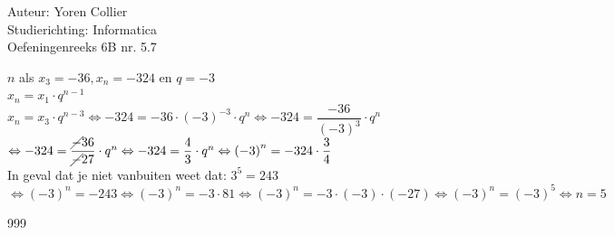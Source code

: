 \documentclass[a4paper]{article}
\newcommand{\asa}{\Leftrightarrow} %
\newcommand{\Lh}{\left(} %
\newcommand{\Rh}{\right)}
\newcommand{\schrap}{\cancel}
\begin{document}
\noindent \large Auteur: Yoren Collier \\
\noindent \large Studierichting: Informatica\\
\noindent \large Oefeningenreeks 6B nr. 5.7\\

\medskip

\normalsize

$n$ als $x_3 = -36, x_n = -324$ en $q = -3$\\

$x_n = x_1 \cdot q^{n-1}$\\

$x_n = x_3 \cdot q^{n-3} \asa -324 = -36 \cdot \Lh -3 \Rh^{-3} \cdot q^n \asa -324 = \dfrac{-36}{\Lh -3 \Rh^3} \cdot q^n$\\

$\asa -324 = \dfrac{\schrap{-}36}{\schrap{-}27} \cdot q^n \asa -324 = \dfrac{4}{3} \cdot q^n \asa \Lh -3 \Rh^n = -324 \cdot \dfrac{3}{4}$\\

In geval dat je niet vanbuiten weet dat: $3^5 = 243$\\

$\asa \Lh -3 \Rh^n = -243 \asa \Lh -3 \Rh^n = -3 \cdot 81 \asa \Lh -3 \Rh^n = -3 \cdot \Lh -3 \Rh \cdot \Lh -27 \Rh \asa \Lh -3 \Rh^n = \Lh -3 \Rh^5 \asa n = 5$\\

\begin{thebibliography}{999}
\end{thebibliography}
\end{document}
